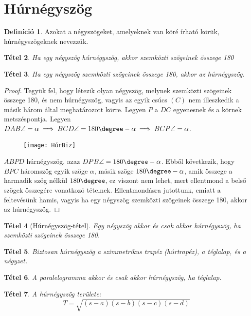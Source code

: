 \documentclass[twoside,12pt]{report}
\newtheorem{theorem}{Tétel}[section]
\theoremstyle{definition}
\newtheorem{definition}[theorem]{Definíció}
\begin{document}
\section{Húrnégyszög}
	\begin{definition}
		Azokat a négyszögeket, amelyeknek van köré írható körük, húrnégyszögeknek nevezzük.
	\end{definition}
	\begin{theorem}
		Ha egy négyszög húrnégyszög, akkor szemközti szögeinek összege 180\degree
	\end{theorem}
	\begin{theorem}
		Ha egy négyszög szemközti szögeinek összege 180\degree, akkor az húrnégyszög.
	\end{theorem}
	\begin{proof}
		Tegyük fel, hogy létezik olyan négyszög, melynek szemközti szögeinek összege 180\degree, és nem húrnégyszög, vagyis az egyik csúcs $(C)$ nem illeszkedik a másik három által meghatározott körre. Legyen $P$ a $DC$ egyenesnek és a körnek metszéspontja. Legyen $DAB\angle=\alpha\implies BCD\angle=180\degree-\alpha\implies BCP\angle=\alpha$.
		\begin{figure}[H]
			\centering
			\texttt{[image: HúrBiz]}
		\end{figure}
		$ABPD$ húrnégyszög, azaz  $DPB\angle=180\degree-\alpha$. Ebből következik, hogy $BPC$ háromszög egyik szöge $\alpha$, másik szöge $180\degree-\alpha$, amik összege a harmadik szög nélkül $180\degree$, ez viszont nem lehet, mert ellentmond a belső szögek összegére vonatkozó tételnek. Ellentmondásra jutottunk, emiatt a feltevésünk hamis, vagyis ha egy négyszög szemközti szögeinek összege 180\degree, akkor az húrnégyszög.
	\end{proof}
	\begin{theorem}[Húrnégyszög-tétel]
		Egy négyszög akkor és csak akkor húrnégyszög, ha szemközti szögeinek összege 180\degree.
	\end{theorem}
	\begin{theorem}
		Biztosan húrnégyszög a szimmetrikus trapéz (húrtrapéz), a téglalap, és a négyzet.
	\end{theorem}
	\begin{theorem}
		A paralelogramma akkor és csak akkor húrnégyszög, ha téglalap.
	\end{theorem}
	\begin{theorem}
		A húrnégyszög területe:
		\begin{equation*}
			T=\sqrt{(s-a)(s-b)(s-c)(s-d)}
		\end{equation*}
	\end{theorem}
\end{document}
